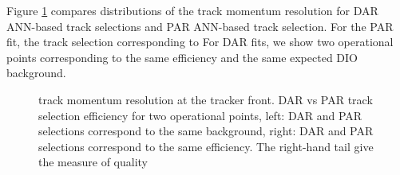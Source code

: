 Figure \ref{fig:dar_vs_par_ann} compares distributions of the track momentum resolution for DAR ANN-based track
selections and PAR ANN-based track selection. For the PAR fit, the track selection corresponding to For DAR fits, 
we show two operational points corresponding to the same efficiency and the same expected DIO background.

\begin{figure}
  \label{fig:dar_vs_par_ann}
\caption{
  track momentum resolution at the tracker front. 
  DAR vs PAR track selection efficiency for two operational points, left: DAR and PAR selections correspond to the same background, 
  right: DAR and PAR selections correspond to the same efficiency. The right-hand tail give the measure of quality 
}
\end{figure}

